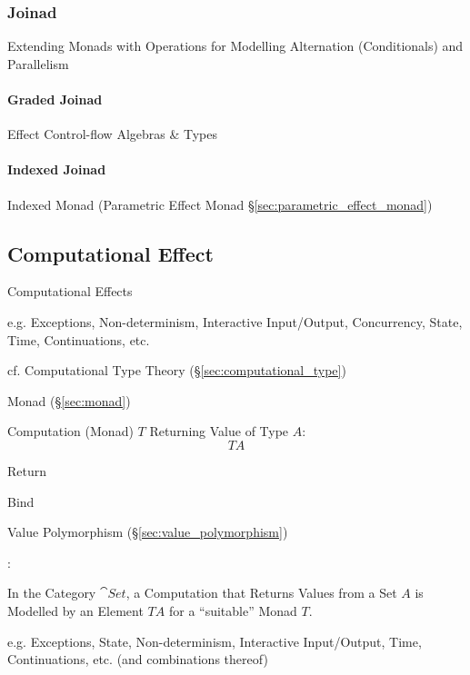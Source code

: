 \subsubsection{Joinad}\label{sec:joinad}

Extending Monads with Operations for Modelling Alternation
(Conditionals) and Parallelism



\paragraph{Graded Joinad}\label{sec:graded_joinad}\hfill

Effect Control-flow Algebras \& Types



\paragraph{Indexed Joinad}\label{sec:indexed_joinad}\hfill

Indexed Monad (Parametric Effect Monad
\S\ref{sec:parametric_effect_monad})



\subsection{Computational Effect}\label{sec:computational_effect}

Computational Effects

e.g. Exceptions, Non-determinism, Interactive Input/Output,
Concurrency, State, Time, Continuations, etc. \cite{plotkin-pretnar09}

\fist cf. Computational Type Theory (\S\ref{sec:computational_type})

Monad (\S\ref{sec:monad})

Computation (Monad) $T$ Returning Value of Type $A$:
\[
  T A
\]

Return

Bind

Value Polymorphism (\S\ref{sec:value_polymorphism})

\cite{plotkin-pretnar13}:

In the Category $\cat{Set}$, a Computation that Returns Values from a
Set $A$ is Modelled by an Element $T A$ for a ``suitable'' Monad $T$.

e.g. Exceptions, State, Non-determinism, Interactive Input/Output,
Time, Continuations, etc. (and combinations thereof)

